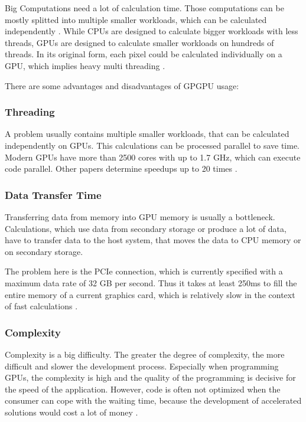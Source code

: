 \documentclass[conference]{IEEEtran}
\begin{document}
		
		
		Big Computations need a lot of calculation time. Those computations can be mostly splitted into multiple smaller workloads, which can be calculated independently \cite{GPGPUCompiler}. While CPUs are designed to calculate bigger workloads with less threads, GPUs are designed to calculate smaller workloads on hundreds of threads. In its original form, each pixel could be calculated individually on a GPU, which implies heavy multi threading \cite{myth}.
		
		
		
		There are some advantages and disadvantages of GPGPU usage:
		
		\subsubsection{Threading} A problem usually contains multiple smaller workloads, that can be calculated independently on GPUs. This calculations can be processed parallel to save time. Modern GPUs have more than 2500 cores with up to 1.7 GHz, which can execute code parallel. Other papers determine speedups up to 20 times \cite{1080gtx} \cite{speedup}.
		
		
		\subsubsection{Data Transfer Time}  Transferring data from memory into GPU memory is usually a bottleneck. Calculations, which use data from secondary storage or produce a lot of data, have to transfer data to the host system, that moves the data to CPU memory or on secondary storage.
		
		The problem here is the PCIe connection, which is currently specified with a maximum data rate of 32 GB per second. Thus it takes at least 250ms to fill the entire memory of a current graphics card, which is relatively slow in the context of fast calculations \cite{1080gtx} \cite{transferspeedup}.
		
		
		\subsubsection{Complexity} Complexity is a big difficulty. The greater the degree of complexity, the more difficult and slower the development process.  Especially when programming GPUs, the complexity is high and the quality of the programming is decisive for the speed of the application. However, code is often not optimized when the consumer can cope with the waiting time, because the development of accelerated solutions would cost a lot of money \cite{cudalite}.
		
\end{document}
